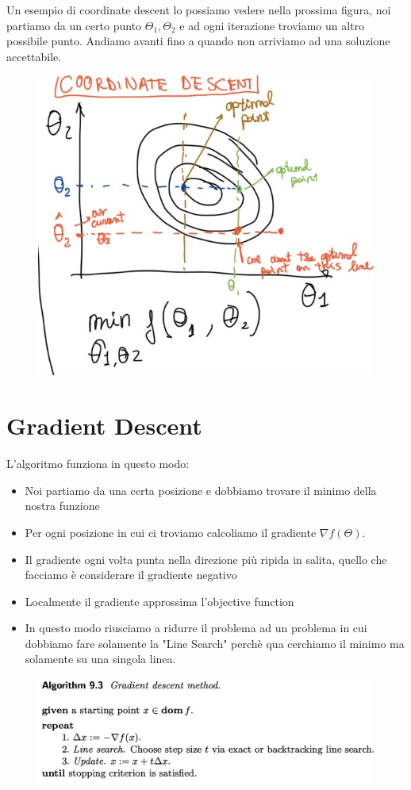 \documentclass[14pt]{extreport}
\begin{document}
Un esempio di coordinate descent lo possiamo vedere nella prossima figura, noi partiamo da un certo punto $\Theta_1, \Theta_2$ e ad ogni iterazione
troviamo un altro possibile punto. Andiamo avanti fino a quando non arriviamo ad una soluzione accettabile.

\begin{figure}[H]
\centering
\includegraphics[width=0.7\linewidth]{237.jpeg}
\end{figure}


\section{Gradient Descent}

L'algoritmo funziona in questo modo:

\begin{itemize}
\item Noi partiamo da una certa posizione e dobbiamo trovare il minimo della nostra funzione
\item Per ogni posizione in cui ci troviamo calcoliamo il gradiente $\nabla f(\Theta)$.
\item Il gradiente ogni volta punta nella direzione più ripida in salita, quello che facciamo è considerare il gradiente negativo
\item Localmente il gradiente approssima l'objective function
\item In questo modo riusciamo a ridurre il problema ad un problema in cui dobbiamo fare solamente la "Line Search" perchè qua cerchiamo il minimo ma
solamente su una singola linea.
\end{itemize}

\begin{figure}[H]
\centering
\includegraphics[width=0.7\linewidth]{238.jpeg}
\end{figure}
\end{document}
